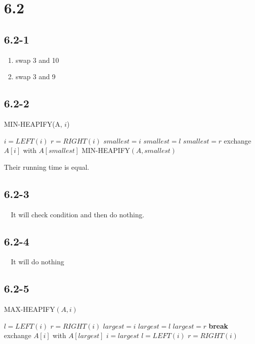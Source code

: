 \documentclass[10pt]{article}
\begin{document}
\section*{6.2}

\subsection*{6.2-1}
\begin{enumerate}
\item swap 3 and 10
\item swap 3 and 9
\end{enumerate}

\subsection*{6.2-2}
\begin{algorithm}
\caption{MIN-HEAPIFY(A, $i$)}
\begin{algorithmic}[1]
\STATE $i = LEFT(i)$
\STATE $r = RIGHT(i)$
\STATE $smallest = i$
\ELSE
\STATE $smallest = l$
\ENDIF
{}
\STATE $smallest = r$
\ENDIF
{}
\STATE exchange $A[i]$ with $A[smallest]$
\STATE MIN-HEAPIFY$(A, smallest)$
\ENDIF
\end{algorithmic}
\end{algorithm}
Their running time is equal.

\subsection*{6.2-3}
~~It will check condition and then do nothing.


\subsection*{6.2-4}
~~It will do nothing

\subsection*{6.2-5}
\begin{algorithm}
\caption{MAX-HEAPIFY$(A, i)$}
\begin{algorithmic}[1]
\STATE $l = LEFT(i)$
\STATE $r = RIGHT(i)$
\STATE $largest = i$
\STATE $largest = l$
\ENDIF
{}
\STATE $largest = r$
\ENDIF
{}
\STATE \textbf{break}
\ELSE
\STATE exchange $A[i]$ with $A[largest]$
\STATE $i = largest$
\STATE $l = LEFT(i)$
\STATE $r = RIGHT(i)$
\ENDIF
\ENDWHILE
\end{algorithmic}
\end{algorithm}
\end{document}

